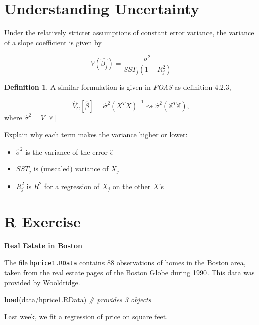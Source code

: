 \documentclass[
]{book}
\newenvironment{Shaded}{\begin{snugshade}}{\end{snugshade}}
\newcommand{\CommentTok}[1]{\textcolor[rgb]{0.56,0.35,0.01}{\textit{#1}}}
\newcommand{\FunctionTok}[1]{\textcolor[rgb]{0.13,0.29,0.53}{\textbf{#1}}}
\newcommand{\NormalTok}[1]{#1}
\newcommand{\StringTok}[1]{\textcolor[rgb]{0.31,0.60,0.02}{#1}}
\providecommand{\tightlist}{%
  \setlength{\itemsep}{0pt}\setlength{\parskip}{0pt}}
\theoremstyle{definition}
\newtheorem{definition}{Definition}[chapter]
\theoremstyle{definition}
\theoremstyle{definition}
\theoremstyle{definition}
\theoremstyle{remark}
\begin{document}
\section{Understanding Uncertainty}\label{understanding-uncertainty-1}

Under the relatively stricter assumptions of constant error variance, the variance of a slope coefficient is given by

\[
  V(\hat{\beta_j}) = \frac{\sigma^2}{SST_j (1-R_j^2)}
\]

\begin{definition}
A similar formulation is given in \emph{FOAS} as definition 4.2.3,

\[
  \hat{V}_{C}[\hat{\beta}] = \hat{\sigma}^2 \left( X^{T} X \right)^{-1} \rightsquigarrow \hat{\sigma}^{2}{\left(\mathbb{X}^{T}\mathbb{X}\right)}, 
\]
where \(\hat{\sigma}^{2} = V[\hat{\epsilon}]\)
\end{definition}

Explain why each term makes the variance higher or lower:

\begin{itemize}
\tightlist
\item
  \(\hat{\sigma}^2\) is the variance of the error \(\hat{\epsilon}\)
\item
  \(SST_j\) is (unscaled) variance of \(X_j\)
\item
  \(R_j^2\) is \(R^2\) for a regression of \(X_j\) on the other \(X\)'s
\end{itemize}

\section{R Exercise}\label{r-exercise-1}

\textbf{Real Estate in Boston}

The file \texttt{hprice1.RData} contains 88 observations of homes in the Boston area, taken from the real estate pages of the Boston Globe during 1990. This data was provided by Wooldridge.

\begin{Shaded}
\begin{Highlighting}[]
\FunctionTok{load}\NormalTok{(}\StringTok{\textquotesingle{}data/hprice1.RData\textquotesingle{}}\NormalTok{) }\CommentTok{\# provides 3 objects }
\end{Highlighting}
\end{Shaded}

Last week, we fit a regression of price on square feet.
\end{document}
